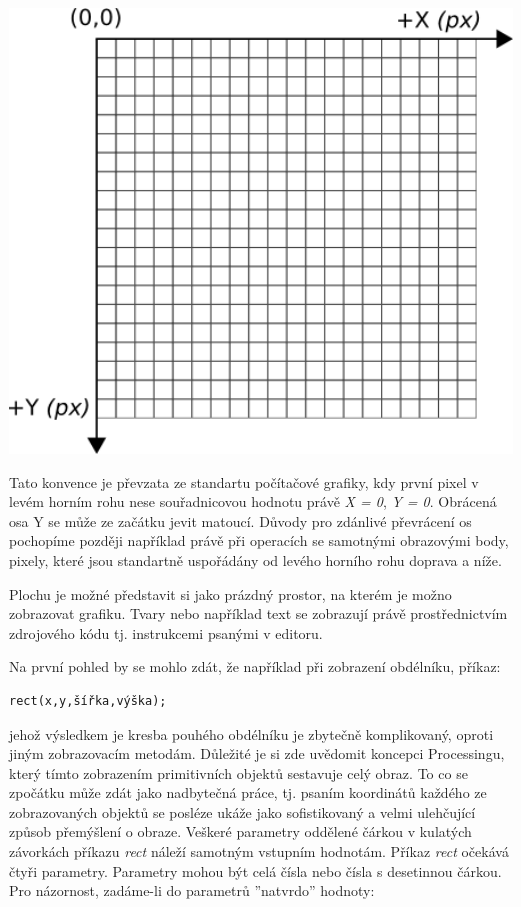 \documentclass[10pt,twopage]{book}
\begin{document}
\begin{center}
\includegraphics[width = 1\textwidth]{imgs/grid2d.png}
\end{center}

Tato konvence je převzata ze standartu počítačové grafiky, kdy první pixel v levém horním rohu nese souřadnicovou hodnotu právě {\em X = 0}, {\em Y = 0}. Obrácená osa Y se může ze začátku jevit matoucí. Důvody pro zdánlivé převrácení os pochopíme později například právě při operacích se samotnými obrazovými body, pixely, které jsou standartně uspořádány od levého horního rohu doprava a níže.

Plochu je možné představit si jako prázdný prostor, na kterém je možno zobrazovat grafiku. Tvary nebo například text se zobrazují právě prostřednictvím zdrojového kódu tj. instrukcemi psanými v editoru.

Na první pohled by se mohlo zdát, že například při zobrazení obdélníku, příkaz:

\begin{lstlisting}
rect(x,y,šířka,výška);
\end{lstlisting}

jehož výsledkem je kresba pouhého obdélníku je zbytečně komplikovaný, oproti jiným zobrazovacím metodám. Důležité je si zde uvědomit koncepci Processingu, který tímto zobrazením primitivních objektů sestavuje celý obraz. To co se zpočátku může zdát jako nadbytečná práce, tj. psaním koordinátů každého ze zobrazovaných objektů se posléze ukáže jako sofistikovaný a velmi ulehčující způsob přemýšlení o obraze. Veškeré parametry oddělené čárkou v kulatých závorkách příkazu {\em rect} náleží samotným vstupním hodnotám. Příkaz {\em rect} očekává čtyři parametry. Parametry mohou být celá čísla nebo čísla s desetinnou čárkou. Pro názornost, zadáme-li do parametrů ''natvrdo'' hodnoty:
\end{document}
